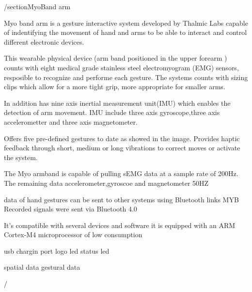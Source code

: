/section{MyoBand arm}

Myo band arm is a gesture interactive system developed by Thalmic Labs capable of indentifying the movement of hand and arms  to be able to interact and control different electronic devices. 


This wearable physical device (arm band positioned in the upper forearm ) counts with eight medical grade stainless steel electromyogram (EMG) sensors, resposible to recognize and performe each gesture. The systems counts with sizing clips which allow for a more tight grip, more appropriate for smaller arms. 

In addition has nine axis inertial measurement unit(IMU) which enables the detection of arm movement. IMU include three axis gyroscope,three axis accelerometter and three axis magnetometer.

Offers five pre-defined gestures to date as showed in the image. Provides haptic feedback through short, medium or long vibrations to correct moves or activate the system.

The Myo armband is capable of pulling sEMG data at a sample rate of 200Hz.
The remaining data accelerometer,gyroscoe and magnetometer 50HZ



data of hand gestures can be sent to other systems using Bluetooth links
MYB Recorded signals were sent via Bluetooth 4.0 

It's compatible with several devices and software %
it is equipped with an ARM Cortex-M4 microprocessor of low consumption

usb chargin port
logo led
status led

spatial data 
gestural data


/